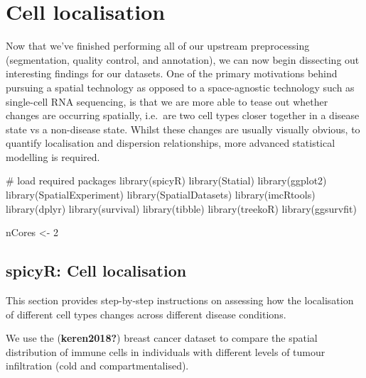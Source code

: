 \documentclass[
  letterpaper,
  DIV=11,
  numbers=noendperiod]{scrreprt}
\newenvironment{Shaded}{\begin{snugshade}}{\end{snugshade}}
\newcommand{\CommentTok}[1]{\textcolor[rgb]{0.37,0.37,0.37}{#1}}
\newcommand{\DecValTok}[1]{\textcolor[rgb]{0.68,0.00,0.00}{#1}}
\newcommand{\FunctionTok}[1]{\textcolor[rgb]{0.28,0.35,0.67}{#1}}
\newcommand{\NormalTok}[1]{\textcolor[rgb]{0.00,0.23,0.31}{#1}}
\newcommand{\OtherTok}[1]{\textcolor[rgb]{0.00,0.23,0.31}{#1}}
\begin{document}

\chapter{Cell localisation}\label{cell-localisation}

Now that we've finished performing all of our upstream preprocessing
(segmentation, quality control, and annotation), we can now begin
dissecting out interesting findings for our datasets. One of the primary
motivations behind pursuing a spatial technology as opposed to a
space-agnostic technology such as single-cell RNA sequencing, is that we
are more able to tease out whether changes are occurring spatially,
i.e.~are two cell types closer together in a disease state vs a
non-disease state. Whilst these changes are usually visually obvious, to
quantify localisation and dispersion relationships, more advanced
statistical modelling is required.

\begin{Shaded}
\begin{Highlighting}[]
\CommentTok{\# load required packages}
\FunctionTok{library}\NormalTok{(spicyR)}
\FunctionTok{library}\NormalTok{(Statial)}
\FunctionTok{library}\NormalTok{(ggplot2)}
\FunctionTok{library}\NormalTok{(SpatialExperiment)}
\FunctionTok{library}\NormalTok{(SpatialDatasets)}
\FunctionTok{library}\NormalTok{(imcRtools)}
\FunctionTok{library}\NormalTok{(dplyr)}
\FunctionTok{library}\NormalTok{(survival)}
\FunctionTok{library}\NormalTok{(tibble)}
\FunctionTok{library}\NormalTok{(treekoR)}
\FunctionTok{library}\NormalTok{(ggsurvfit)}

\NormalTok{nCores }\OtherTok{\textless{}{-}} \DecValTok{2}
\end{Highlighting}
\end{Shaded}

\section{spicyR: Cell localisation}\label{spicyr-cell-localisation}

This section provides step-by-step instructions on assessing how the
localisation of different cell types changes across different disease
conditions.

We use the (\textbf{keren2018?}) breast cancer dataset to compare the
spatial distribution of immune cells in individuals with different
levels of tumour infiltration (cold and compartmentalised).
\end{document}
